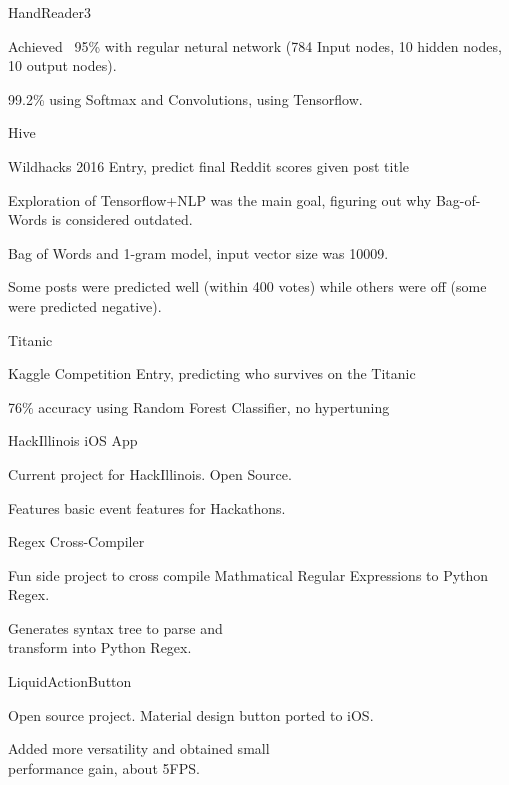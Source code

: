 \documentclass{tccv}
\newenvironment{itemize*}%
{\begin{itemize}%
    \vspace{-0.7em}
    \setlength{\itemsep}{0pt}%
    \setlength{\parskip}{0pt}}%
  {\end{itemize}}
\begin{document}
\begin{projectlist}

  {HandReader3}
  \begin{itemize*}
  \item Achieved ~95\% with regular netural network (784 Input nodes, 10 hidden nodes, 10 output nodes).
  \item 99.2\% using Softmax and Convolutions, using Tensorflow.
  \end{itemize*}

  {Hive}
  \begin{itemize*}
  \item Wildhacks 2016 Entry, predict final Reddit scores given post title
  \item Exploration of Tensorflow+NLP was the main goal, figuring out why Bag-of-Words is considered outdated.
  \item Bag of Words and 1-gram model, input vector size was 10009.
  \item Some posts were predicted well (within 400 votes) while others were off (some were predicted negative).
  \end{itemize*}

  {Titanic}
  \begin{itemize*}
  \item Kaggle Competition Entry, predicting who survives on the Titanic
  \item 76\% accuracy using Random Forest Classifier, no hypertuning
  \end{itemize*}

  {HackIllinois iOS App}
  \begin{itemize*}
  \item Current project for HackIllinois. Open Source.
  \item Features basic event features for Hackathons.
  \end{itemize*}

  {Regex Cross-Compiler}
  \begin{itemize*}
  \item Fun side project to cross compile Mathmatical Regular Expressions to Python Regex.
  \item Generates syntax tree to parse and \\
    transform into Python Regex.

  \end{itemize*}
  {LiquidActionButton}
  \begin{itemize*}
  \item Open source project. Material design button ported to iOS.
  \item Added more versatility and obtained small \\
    performance gain, about 5FPS.
  \end{itemize*}


\end{projectlist}
\end{document}
